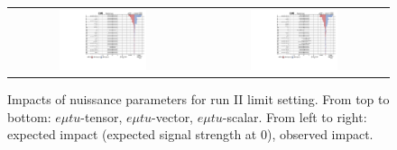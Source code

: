 \begin{figure}[tbh!]
\begin{center}
\begin{tabular}{cc}
   \includegraphics[width=0.48\textwidth]{figures/Appendix/Impact/Impact_ScalarU_expected0}&
  \includegraphics[width=0.48\textwidth]{figures/Appendix/Impact/Impact_ScalarU}\\
 \end{tabular}
 \caption{Impacts of nuissance parameters for run II limit setting. From top to bottom: $e\mu tu$-tensor, $e\mu tu$-vector, $e\mu tu$-scalar. From left to right: expected impact (expected signal strength at 0), observed impact.}
 \label{fig:Impact0}
 \end{center}
\end{figure}

